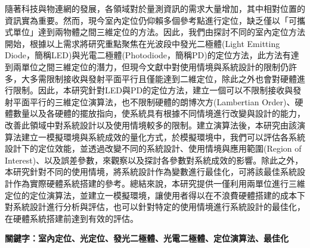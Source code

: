 \begin{abstractCH}

  隨著科技與物連網的發展，各領域對於量測資訊的需求大量增加，其中相對位置的資訊實為重要。然而，現今室內定位仍仰賴多個參考點進行定位，缺乏僅以「可攜式單位」達到兩物體之間三維定位的方法。因此，我們由探討不同的室內定位方法開始，根據以上需求將研究重點聚焦在光波段中發光二極體(Light Emitting Diode，簡稱LED)與光電二極體(Photodiode，簡稱PD)的定位方法，此方法有達到兩單位之間三維定位的潛力，但現今文獻中對使用情境與系統設計的限制仍許多，大多需限制接收與發射平面平行且僅能達到二維定位，除此之外也會對硬體進行限制。因此，本研究針對LED與PD的定位方法，建立一個可以不限制接收與發射平面平行的三維定位演算法，也不限制硬體的朗博次方(Lambertian Order)、硬體數量以及各硬體的擺放指向，使系統具有根據不同情境進行改變與設計的能力，改善此領域中對系統設計以及使用情境較多的限制。建立演算法後，本研究由該演算法建立一模擬環境與系統成效的量化方式，於模擬環境中，我們可以評估各系統設計下的定位效能，並透過改變不同的系統設計、使用情境與應用範圍(Region of Interest)、以及誤差參數，來觀察以及探討各參數對系統成效的影響。除此之外，本研究針對不同的使用情境，將系統設計作為變數進行最佳化，可將該最佳系統設計作為實際硬體系統搭建的參考。總結來說，本研究提供一僅利用兩單位進行三維定位的定位演算法，並建立一模擬環境，讓使用者得以在不浪費硬體搭建的成本下對系統設計進行分析與評估，也可以針對特定的使用情境進行系統設計的最佳化，在硬體系統搭建前達到有效的評估。


  \vspace{1cm}
  \noindent \textbf{關鍵字：室內定位、光定位、發光二極體、光電二極體、定位演算法、最佳化}

\end{abstractCH}
